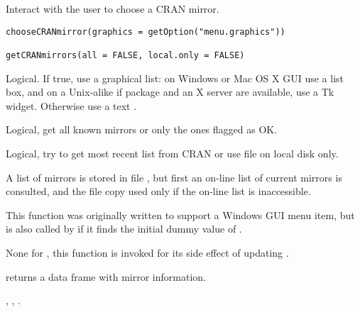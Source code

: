 %
\begin{Description}\relax
Interact with the user to choose a CRAN mirror.
\end{Description}
%
\begin{Usage}
\begin{verbatim}
chooseCRANmirror(graphics = getOption("menu.graphics"))

getCRANmirrors(all = FALSE, local.only = FALSE)
\end{verbatim}
\end{Usage}
%
\begin{Arguments}
\begin{ldescription}
\item[\code{graphics}] Logical. If true, use a graphical list: on Windows or
Mac OS X GUI use a list box, and on a Unix-alike if package
 and an X server are available, use a Tk
widget. Otherwise use a text .

\item[\code{all}] Logical, get all known mirrors or only the ones flagged as OK.
\item[\code{local.only}] Logical, try to get most recent list from CRAN or
use file on local disk only.
\end{ldescription}
\end{Arguments}
%
\begin{Details}\relax
A list of mirrors is stored in file
, but first an on-line list of
current mirrors is consulted, and the file copy used only if the
on-line list is inaccessible.

This function was originally written to support a Windows GUI menu
item, but is also called by  if it finds the
initial dummy value of .
\end{Details}
%
\begin{Value}
None for , this function is invoked for its
side effect of updating .

 returns a data frame with mirror information.
\end{Value}
%
\begin{SeeAlso}\relax
{}, ,
.
\end{SeeAlso}
